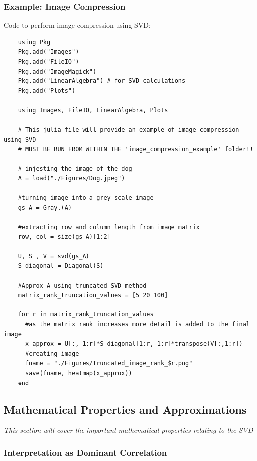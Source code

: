 \documentclass[11.5pt,a4paper]{article}
\begin{document}
\subsubsection*{Example: Image Compression}
Code to perform image compression using SVD:
\begin{verbatim}
    using Pkg
    Pkg.add("Images")
    Pkg.add("FileIO")
    Pkg.add("ImageMagick")
    Pkg.add("LinearAlgebra") # for SVD calculations
    Pkg.add("Plots")
    
    using Images, FileIO, LinearAlgebra, Plots

    # This julia file will provide an example of image compression using SVD
    # MUST BE RUN FROM WITHIN THE 'image_compression_example' folder!!
    
    # injesting the image of the dog
    A = load("./Figures/Dog.jpeg")
    
    #turning image into a grey scale image
    gs_A = Gray.(A)
    
    #extracting row and column length from image matrix
    row, col = size(gs_A)[1:2]
    
    U, S , V = svd(gs_A)
    S_diagonal = Diagonal(S)
    
    #Approx A using truncated SVD method
    matrix_rank_truncation_values = [5 20 100]
    
    for r in matrix_rank_truncation_values
      #as the matrix rank increases more detail is added to the final image
      x_approx = U[:, 1:r]*S_diagonal[1:r, 1:r]*transpose(V[:,1:r])
      #creating image
      fname = "./Figures/Truncated_image_rank_$r.png"
      save(fname, heatmap(x_approx))
    end
\end{verbatim}


\subsection*{Mathematical Properties and Approximations}

\noindent \textit{This section will cover the important mathematical properties relating to the SVD}

\subsubsection*{Interpretation as Dominant Correlation}
\end{document}
